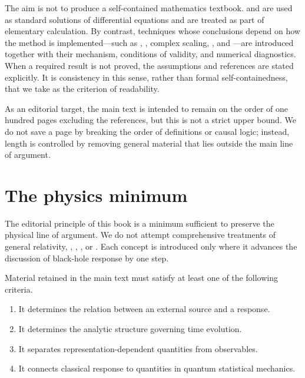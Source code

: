 The aim is not to produce a self-contained mathematics textbook.  and  are used as standard solutions of differential equations and are treated as part of elementary calculation. By contrast, techniques whose conclusions depend on how the method is implemented---such as , , complex scaling, , and ---are introduced together with their mechanism, conditions of validity, and numerical diagnostics. When a required result is not proved, the assumptions and references are stated explicitly. It is consistency in this sense, rather than formal self-containedness, that we take as the criterion of readability.

As an editorial target, the main text is intended to remain on the order of one hundred pages excluding the references, but this is not a strict upper bound. We do not save a page by breaking the order of definitions or causal logic; instead, length is controlled by removing general material that lies outside the main line of argument.

\section*{The physics minimum}

The editorial principle of this book is a minimum sufficient to preserve the physical line of argument. We do not attempt comprehensive treatments of general relativity, , , , or . Each concept is introduced only where it advances the discussion of black-hole response by one step.

Material retained in the main text must satisfy at least one of the following criteria.

\begin{enumerate}[label=(\roman*),leftmargin=2.8em]
\item It determines the relation between an external source and a response.
\item It determines the analytic structure governing time evolution.
\item It separates representation-dependent quantities from observables.
\item It connects classical response to quantities in quantum statistical mechanics.
\end{enumerate}

